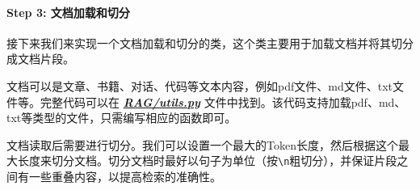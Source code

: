 \documentclass[12pt,a4paper]{book}
\begin{document}
\paragraph{Step 3:
文档加载和切分}\label{step-3-ux6587ux6863ux52a0ux8f7dux548cux5207ux5206}

接下来我们来实现一个文档加载和切分的类，这个类主要用于加载文档并将其切分成文档片段。

文档可以是文章、书籍、对话、代码等文本内容，例如pdf文件、md文件、txt文件等。完整代码可以在
\textbf{\emph{\href{./RAG/utils.py}{RAG/utils.py}}}
文件中找到。该代码支持加载pdf、md、txt等类型的文件，只需编写相应的函数即可。

\begin{Shaded}
\begin{Highlighting}[]
\NormalTok{):}
    \NormalTok{):}
    \NormalTok{):}
    \NormalTok{):}
    \NormalTok{:}
         \NormalTok{(}\NormalTok{)}
\end{Highlighting}
\end{Shaded}

文档读取后需要进行切分。我们可以设置一个最大的Token长度，然后根据这个最大长度来切分文档。切分文档时最好以句子为单位（按\texttt{\textbackslash{}n}粗切分），并保证片段之间有一些重叠内容，以提高检索的准确性。
\end{document}
